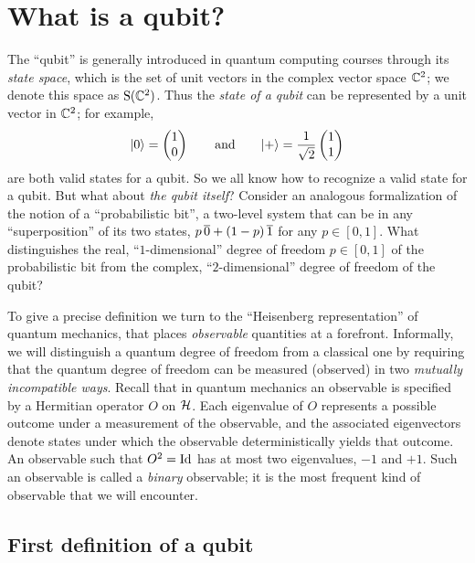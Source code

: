 \section{What is a qubit?}

The  ``qubit'' is generally introduced in quantum computing courses through its \emph{state space}, which is the set of unit vectors in the complex vector space $\mathbb{C}^2$; we denote this space as $\mathrm{S}(\mathbb{C}^2)$. Thus the \emph{state of a qubit} can be represented by a unit vector in $\mathbb{C}^2$; for example, 
\[|0\rangle = \begin{pmatrix} 1 \\ 0 \end{pmatrix}\qquad\text{and}\qquad |+\rangle = \frac{1}{\sqrt{2}}\begin{pmatrix} 1 \\ 1 \end{pmatrix}\]
are both valid states for a qubit. So we all know how to recognize a valid state for a qubit. But what about \emph{the qubit itself}? Consider an analogous formalization of the notion of a ``probabilistic bit'', a two-level system that can be in any ``superposition'' of its two states, $p \,\overline{0} + (1-p)\,\overline{1}$ for any $p\in [0,1]$. What distinguishes the real, ``$1$-dimensional'' degree of freedom $p\in [0,1]$  of the probabilistic bit from the complex, ``$2$-dimensional'' degree of freedom of the qubit?

To give a precise definition we turn to the ``Heisenberg representation'' of quantum mechanics, that places \emph{observable} quantities at a forefront. Informally, we will distinguish a quantum degree of freedom from a classical one by requiring that the quantum degree of freedom can be measured (observed) in two \emph{mutually incompatible ways}.  
Recall that in quantum mechanics an observable is specified by 
 a Hermitian operator $O$ on $\mathcal{H}$.
 Each eigenvalue of $O$ represents a possible outcome under a measurement of the observable, and  the associated eigenvectors denote states under which the observable deterministically yields that outcome. 
An observable such that $O^2=\mathop{\rm Id}\nolimits$ has at most two eigenvalues, $-1$ and $+1$. Such an observable is called a \emph{binary} observable; it is the most frequent kind of observable that we will encounter. 

\subsection{First definition of a qubit}

